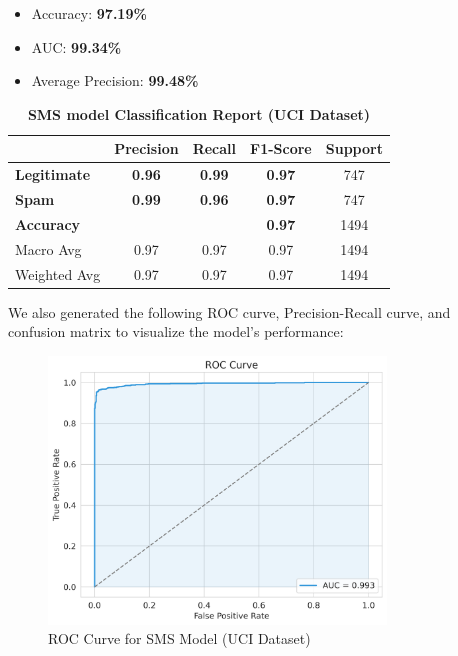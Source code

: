 \documentclass{article}
\begin{document}
\begin{itemize}
    \item Accuracy: \textbf{97.19\%}
    \item AUC: \textbf{99.34\%}
    \item Average Precision: \textbf{99.48\%}
\end{itemize}

\begin{table}[htbp]
    \centering
    \caption{\textbf{SMS model Classification Report (UCI Dataset)}}
    \begin{tabular}{l c c c c}
    \toprule
     & \textbf{Precision} & \textbf{Recall} & \textbf{F1-Score} & Support \\
    \midrule
    \textbf{Legitimate} & \textbf{0.96} & \textbf{0.99} & \textbf{0.97} & 747 \\
    \textbf{Spam} & \textbf{0.99} & \textbf{0.96} & \textbf{0.97} & 747 \\
    \midrule
    \textbf{Accuracy} & & & \textbf{0.97} & 1494 \\
    Macro Avg & 0.97 & 0.97 & 0.97 & 1494 \\
    Weighted Avg & 0.97 & 0.97 & 0.97 & 1494 \\
    \bottomrule
    \end{tabular}
    \label{tab:classification_report_3}
\end{table}

\noindent
We also generated the following ROC curve, Precision-Recall curve, and confusion matrix to visualize the model's performance:

\begin{figure}[htbp]
    \centering
    \includegraphics[width=0.8\textwidth]{../analysis/sms/randomforest/uci/roc_curve.png}
    \caption{ROC Curve for SMS Model (UCI Dataset)}
    \label{fig:roc_curve_3}
\end{figure}
\end{document}
